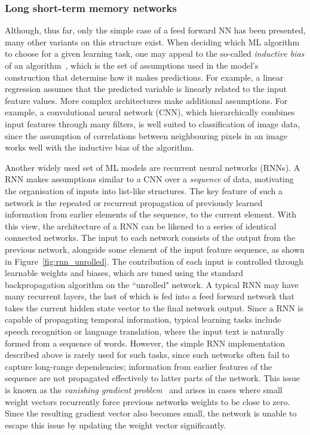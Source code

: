 \subsubsection{Long short-term memory networks}
\label{subsubsection:lstms}

Although, thus far, only the simple case of a feed forward NN has been presented, many other variants on this structure exist. When deciding which ML algorithm to choose for a given learning task, one may appeal to the so-called \emph{inductive bias} of an algorithm~\cite{inductiveBias}, which is the set of assumptions used in the model's construction that determine how it makes predictions. For example, a linear regression assumes that the predicted variable is linearly related to the input feature values. More complex architectures make additional assumptions. For example, a convolutional neural network (CNN), which hierarchically combines input features through many filters, is well suited to classification of image data, since the assumption of correlations between neighbouring pixels in an image works well with the inductive bias of the algorithm. 

Another widely used set of ML models are recurrent neural networks (RNNs). A RNN makes assumptions similar to a CNN over a \textit{sequence} of data, motivating the organisation of inputs into list-like structures. The key feature of such a network is the repeated or recurrent propagation of previously learned information from earlier elements of the sequence, to the current element. With this view, the architecture of a RNN can be likened to a series of identical connected networks. The input to each network consists of the output from the previous network, alongside some element of the input feature sequence, as shown in Figure~\ref{fig:rnn_unrolled}. The contribution of each input is controlled through learnable weights and biases, which are tuned using the standard backpropagation algorithm on the ``unrolled" network. A typical RNN may have many recurrent layers, the last of which is fed into a feed forward network that takes the current hidden state vector to the final network output. Since a RNN is capable of propagating temporal information, typical learning tasks include speech recognition or language translation, where the input text is naturally formed from a sequence of words. However, the simple RNN implementation described above is rarely used for such tasks, since such networks often fail to capture long-range dependencies; information from earlier features of the sequence are not propagated effectively to latter parts of the network. This issue is known as the \textit{vanishing gradient problem}~\cite{vanishingGradient} and arises in cases where small weight vectors recurrently force previous networks weights to be close to zero. Since the resulting gradient vector also becomes small, the network is unable to escape this issue by updating the weight vector significantly.%


